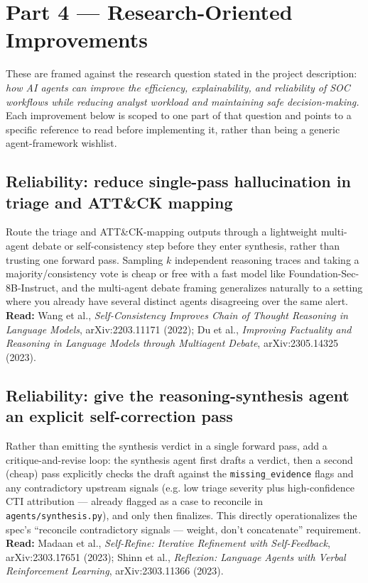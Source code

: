 \documentclass[11pt]{article}
\begin{document}
\section{Part 4 --- Research-Oriented Improvements}
\label{sec:improvements}

These are framed against the research question stated in the project description: \emph{how AI agents can improve the efficiency, explainability, and reliability of SOC workflows while reducing analyst workload and maintaining safe decision-making.} Each improvement below is scoped to one part of that question and points to a specific reference to read before implementing it, rather than being a generic agent-framework wishlist.

\subsection{Reliability: reduce single-pass hallucination in triage and ATT\&CK mapping}
Route the triage and ATT\&CK-mapping outputs through a lightweight multi-agent debate or self-consistency step before they enter synthesis, rather than trusting one forward pass. Sampling $k$ independent reasoning traces and taking a majority/consistency vote is cheap or free with a fast model like Foundation-Sec-8B-Instruct, and the multi-agent debate framing generalizes naturally to a setting where you already have several distinct agents disagreeing over the same alert. \textbf{Read:} Wang et al., \emph{Self-Consistency Improves Chain of Thought Reasoning in Language Models}, arXiv:2203.11171 (2022); Du et al., \emph{Improving Factuality and Reasoning in Language Models through Multiagent Debate}, arXiv:2305.14325 (2023).

\subsection{Reliability: give the reasoning-synthesis agent an explicit self-correction pass}
Rather than emitting the synthesis verdict in a single forward pass, add a critique-and-revise loop: the synthesis agent first drafts a verdict, then a second (cheap) pass explicitly checks the draft against the \texttt{missing\_evidence} flags and any contradictory upstream signals (e.g. low triage severity plus high-confidence CTI attribution --- already flagged as a case to reconcile in \texttt{agents/synthesis.py}), and only then finalizes. This directly operationalizes the spec's ``reconcile contradictory signals --- weight, don't concatenate'' requirement. \textbf{Read:} Madaan et al., \emph{Self-Refine: Iterative Refinement with Self-Feedback}, arXiv:2303.17651 (2023); Shinn et al., \emph{Reflexion: Language Agents with Verbal Reinforcement Learning}, arXiv:2303.11366 (2023).
\end{document}
